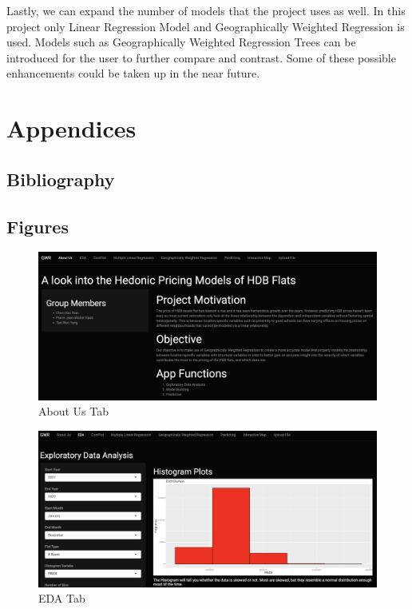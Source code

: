 \documentclass[manuscript,screen]{acmart}
\begin{document}
Lastly, we can expand the number of models that the project uses as
well. In this project only Linear Regression Model and Geographically
Weighted Regression is used. Models such as Geographically Weighted
Regression Trees can be introduced for the user to further compare and
contrast. Some of these possible enhancements could be taken up in the
near future.

\hypertarget{appendices}{%
\section{Appendices}\label{appendices}}

\hypertarget{bibliography}{%
\subsection{Bibliography}\label{bibliography}}





\hypertarget{figures}{%
\subsection{Figures}\label{figures}}

\begin{figure}

{\centering \includegraphics{images/Screenshot 2023-04-14 at 11.08.12 PM.png}

}

\caption{\label{fig-1}About Us Tab}

\end{figure}

\begin{figure}

{\centering \includegraphics{images/Screenshot 2023-04-14 at 11.34.06 PM.png}

}

\caption{\label{fig-2}EDA Tab}

\end{figure}
\end{document}
